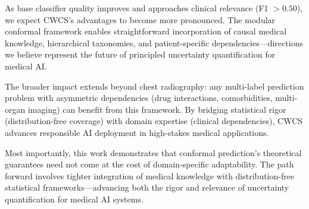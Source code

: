 As base classifier quality improves and approaches clinical relevance (F1 $>0.50$), we expect CWCS's advantages to become more pronounced. The modular conformal framework enables straightforward incorporation of causal medical knowledge, hierarchical taxonomies, and patient-specific dependencies---directions we believe represent the future of principled uncertainty quantification for medical AI.

The broader impact extends beyond chest radiography: any multi-label prediction problem with asymmetric dependencies (drug interactions, comorbidities, multi-organ imaging) can benefit from this framework. By bridging statistical rigor (distribution-free coverage) with domain expertise (clinical dependencies), CWCS advances responsible AI deployment in high-stakes medical applications.

Most importantly, this work demonstrates that conformal prediction's theoretical guarantees need not come at the cost of domain-specific adaptability. The path forward involves tighter integration of medical knowledge with distribution-free statistical frameworks---advancing both the rigor and relevance of uncertainty quantification for medical AI systems.
